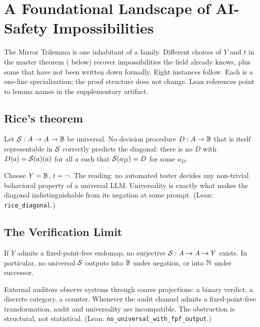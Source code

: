 \section{A Foundational Landscape of AI-Safety Impossibilities}
\label{sec:landscape}

The Mirror Trilemma is one inhabitant of a family. Different choices of $Y$ and $t$ in the master theorem ( below) recover impossibilities the field already knows, plus some that have not been written down formally. Eight instances follow. Each is a one-line specialization; the proof structure does not change. Lean references point to lemma names in the supplementary artifact.

\subsection{Rice's theorem}
\label{subsec:rice}

\begin{theorem}
\label{thm:rice}
Let $\mathcal{S} : A \to A \to \mathbb{B}$ be universal. No decision procedure $D : A \to \mathbb{B}$ that is itself representable in $\mathcal{S}$ correctly predicts the diagonal: there is no $D$ with $D(a) = \mathcal{S}(a)(a)$ for all $a$ such that $\mathcal{S}(a_D) = D$ for some $a_D$.
\end{theorem}

Choose $Y = \mathbb{B}$, $t = \neg$. The reading: no automated tester decides any non-trivial behavioral property of a universal LLM. Universality is exactly what makes the diagonal indistinguishable from its negation at some prompt. (Lean: \texttt{rice\_diagonal}.)

\subsection{The Verification Limit}
\label{subsec:verification}

\begin{theorem}
\label{thm:verification}
If $Y$ admits a fixed-point-free endomap, no surjective $\mathcal{S} : A \to A \to Y$ exists. In particular, no universal $\mathcal{S}$ outputs into $\mathbb{B}$ under negation, or into $\mathbb{N}$ under successor.
\end{theorem}

External auditors observe systems through coarse projections: a binary verdict, a discrete category, a counter. Whenever the audit channel admits a fixed-point-free transformation, audit and universality are incompatible. The obstruction is structural, not statistical. (Lean: \texttt{no\_universal\_with\_fpf\_output}.)


